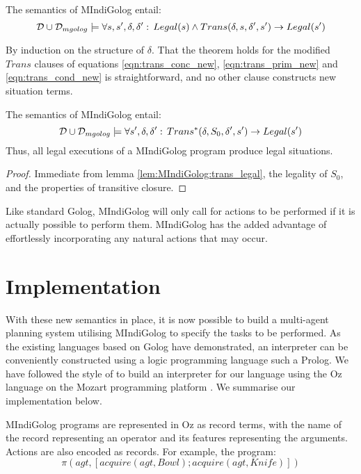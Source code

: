 \begin{lemma}
The semantics of MIndiGolog entail:\label{lem:MIndiGolog:trans_legal}\[
\mathcal{D}\cup\mathcal{D}_{mgolog}\models\forall s,s',\delta,\delta':\, Legal(s)\wedge Trans(\delta,s,\delta',s')\rightarrow Legal(s')\]

\end{lemma}
\begin{proofsketch}
By induction on the structure of $\delta$. That the theorem holds
for the modified $Trans$ clauses of equations \eqref{eqn:trans_conc_new},
\eqref{eqn:trans_prim_new} and \eqref{eqn:trans_cond_new} is straightforward,
and no other clause constructs new situation terms. 
\end{proofsketch}
\begin{thm}
The semantics of MIndiGolog entail: \[
\mathcal{D}\cup\mathcal{D}_{mgolog}\models\forall s',\delta,\delta':\, Trans^{*}(\delta,S_{0},\delta',s')\rightarrow Legal(s')\]
 Thus, all legal executions of a MIndiGolog program produce legal
situations. 
\end{thm}
\begin{proof}
Immediate from lemma \ref{lem:MIndiGolog:trans_legal}, the legality
of $S_{0}$, and the properties of transitive closure. 
\end{proof}
Like standard Golog, MIndiGolog will only call for actions to be performed
if it is actually possible to perform them. MIndiGolog has the added
advantage of effortlessly incorporating any natural actions that may
occur.


\section{Implementation\label{sec:MIndiGolog:Implementation}}

With these new semantics in place, it is now possible to build a multi-agent
planning system utilising MIndiGolog to specify the tasks to be performed.
As the existing languages based on Golog have demonstrated, an interpreter
can be conveniently constructed using a logic programming language
such a Prolog. We have followed the style of \citep{giacomo99indigolog,giacomo00congolog}
to build an interpreter for our language using the Oz language on
the Mozart programming platform \citep{vanroy03mozart_logic}. We
summarise our implementation below.

MIndiGolog programs are represented in Oz as record terms, with the
name of the record representing an operator and its features representing
the arguments. Actions are also encoded as records. For example, the
program:\[
\pi(agt,\left[acquire(agt,Bowl);acquire(agt,Knife)\right])\]


